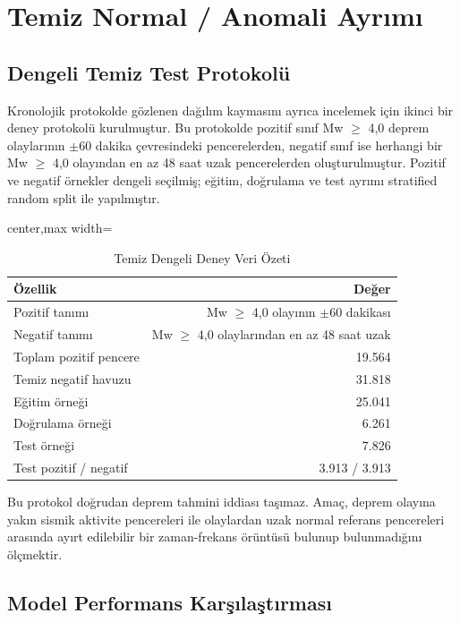 \section{Temiz Normal / Anomali Ayrımı}

\subsection{Dengeli Temiz Test Protokolü}

Kronolojik protokolde gözlenen dağılım kaymasını ayrıca incelemek için ikinci bir deney protokolü kurulmuştur. Bu protokolde pozitif sınıf Mw $\geq$ 4,0 deprem olaylarının $\pm$60 dakika çevresindeki pencerelerden, negatif sınıf ise herhangi bir Mw $\geq$ 4,0 olayından en az 48 saat uzak pencerelerden oluşturulmuştur. Pozitif ve negatif örnekler dengeli seçilmiş; eğitim, doğrulama ve test ayrımı stratified random split ile yapılmıştır.

\begin{table}[htbp]
\centering
\small
\caption{Temiz Dengeli Deney Veri Özeti}
\begin{adjustbox}{center,max width=\textwidth}
\begin{tabularx}{0.88\textwidth}{Xr}
\toprule
\textbf{Özellik} & \textbf{Değer} \\
\midrule
Pozitif tanımı & Mw $\geq$ 4,0 olayının $\pm$60 dakikası \\
Negatif tanımı & Mw $\geq$ 4,0 olaylarından en az 48 saat uzak \\
Toplam pozitif pencere & 19.564 \\
Temiz negatif havuzu & 31.818 \\
Eğitim örneği & 25.041 \\
Doğrulama örneği & 6.261 \\
Test örneği & 7.826 \\
Test pozitif / negatif & 3.913 / 3.913 \\
\bottomrule
\end{tabularx}
\end{adjustbox}
\label{tab:temiz_deney_ozet}
\end{table}

Bu protokol doğrudan deprem tahmini iddiası taşımaz. Amaç, deprem olayına yakın sismik aktivite pencereleri ile olaylardan uzak normal referans pencereleri arasında ayırt edilebilir bir zaman-frekans örüntüsü bulunup bulunmadığını ölçmektir.

\subsection{Model Performans Karşılaştırması}

